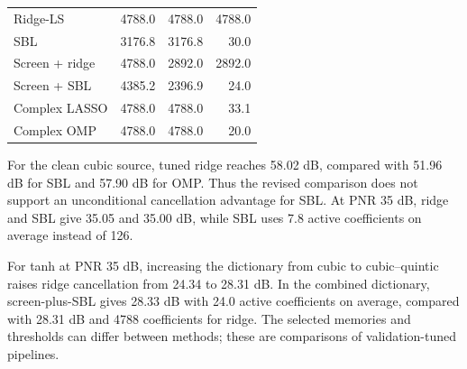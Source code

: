 \begin{table}[!t]
\begin{tabular}{lrrr}
Ridge-LS & 4788.0 & 4788.0 & 4788.0\\

SBL & 3176.8 & 3176.8 & 30.0\\

Screen + ridge & 4788.0 & 2892.0 & 2892.0\\

Screen + SBL & 4385.2 & 2396.9 & 24.0\\

Complex LASSO & 4788.0 & 4788.0 & 33.1\\

Complex OMP & 4788.0 & 4788.0 & 20.0\\

\bottomrule\end{tabular}\end{table}

For the clean cubic source, tuned ridge reaches 58.02 dB, compared with 51.96 dB for SBL and 57.90 dB for OMP. Thus the revised comparison does not support an unconditional cancellation advantage for SBL. At PNR 35 dB, ridge and SBL give 35.05 and 35.00 dB, while SBL uses 7.8 active coefficients on average instead of 126.

For tanh at PNR 35 dB, increasing the dictionary from cubic to cubic--quintic raises ridge cancellation from 24.34 to 28.31 dB. In the combined dictionary, screen-plus-SBL gives 28.33 dB with 24.0 active coefficients on average, compared with 28.31 dB and 4788 coefficients for ridge. The selected memories and thresholds can differ between methods; these are comparisons of validation-tuned pipelines.
